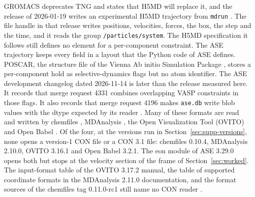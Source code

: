 \documentclass[preprint,12pt]{elsarticle}
\begin{document}
GROMACS deprecates TNG and states that H5MD will replace it, and the
release of 2026-01-19 writes an experimental H5MD trajectory from
\texttt{mdrun} \cite{gromacsManual2026}.
The file handle in that release writes positions, velocities, forces,
the box, the step and the time, and it reads the group
\texttt{/particles/system}.
The H5MD specification it follows still defines no element for a
per-component constraint.
The ASE trajectory keeps every field in a layout that the Python code of
ASE defines.
POSCAR, the structure file of the Vienna Ab initio Simulation Package
\cite{vaspwikiPoscar2026,kresseEfficiencyAbinitioTotal1996}, stores a
per-component hold as selective-dynamics flags but no atom identifier.
The ASE development changelog dated 2026-11-14 is later than the
release measured here.
It records that merge request 4331 combines overlapping VASP
constraints in those flags.
It also records that merge request 4196 makes \texttt{ase.db} write
blob values with the dtype expected by its reader
\cite{aseChangelog20261114}.
Many of these formats are read and written by chemfiles
\cite{frauxChemfileschemfilesVersion01042023,frauxChemfiles2023},
MDAnalysis
\cite{gowersMdanalysisPythonPackage2016,michaudAgrawalMDAnalysisToolkit2011},
the Open Visualization Tool (OVITO)
\cite{stukowskiVisualizationAnalysisAtomistic2010} and Open Babel
\cite{oboyleOpenBabelOpen2011}.
Of the four, at the versions run in
Section~\ref*{sec:supp-versions}, none opens a version-1 CON file or a
CON 3.1 file: chemfiles 0.10.4, MDAnalysis 2.10.0, OVITO 3.16.1 and
Open Babel 3.2.1.
The eon module of ASE 3.29.0 opens both but stops at the velocity
section of the frame of Section~\ref{sec:worked}.
The input-format table of the OVITO 3.17.2 manual, the table of
supported coordinate formats in the MDAnalysis 2.11.0 documentation,
and the format sources of the chemfiles tag 0.11.0-rc1 still name no
CON reader
\cite{ovitoManual3172,gowersMdanalysisCoords2110,frauxChemfiles0110rc12025}.
\end{document}
